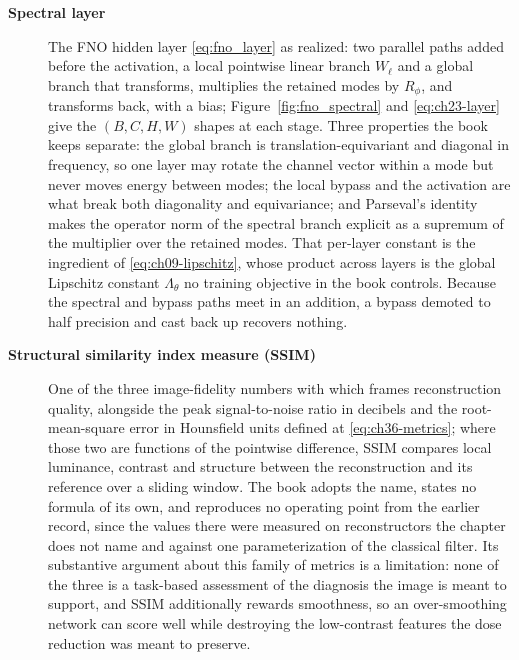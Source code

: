 \begin{description}
\item[\textbf{Spectral layer}] The FNO hidden layer \eqref{eq:fno_layer} as realized: two
parallel paths added before the activation, a local pointwise linear branch $W_{\ell}$ and a
global branch that transforms, multiplies the retained modes by $R_{\phi}$, and transforms
back, with a bias; Figure~\ref{fig:fno_spectral} and \eqref{eq:ch23-layer} give the
$(B, C, H, W)$ shapes at each stage. Three properties the book keeps separate: the global
branch is translation-equivariant and diagonal in frequency, so one layer may rotate the
channel vector within a mode but never moves energy between modes; the local bypass and the
activation are what break both diagonality and equivariance; and Parseval's identity makes
the operator norm of the spectral branch explicit as a supremum of the multiplier over the
retained modes. That per-layer constant is the ingredient of \eqref{eq:ch09-lipschitz},
whose product across layers is the global Lipschitz constant $\Lambda_{\theta}$ no training
objective in the book controls. Because the spectral and bypass paths meet
in an addition, a bypass demoted to half precision and cast back up recovers nothing.

\item[\textbf{Structural similarity index measure (SSIM)}] One of the three image-fidelity
numbers with which  frames
reconstruction quality, alongside the peak signal-to-noise ratio in decibels and the
root-mean-square error in Hounsfield units defined at \eqref{eq:ch36-metrics}; where those
two are functions of the pointwise difference, SSIM compares local luminance, contrast and
structure between the reconstruction and its reference over a sliding window. The book
adopts the name, states no formula of its own, and reproduces no operating point from the
earlier record, since the values there were measured on reconstructors the chapter
does not name and against one parameterization of the classical filter. Its substantive
argument about this family of metrics is a limitation: none of the three is a task-based
assessment of the diagnosis the image is meant to support, and SSIM additionally rewards
smoothness, so an over-smoothing network can score well while destroying the low-contrast
features the dose reduction was meant to preserve.


\end{description}
